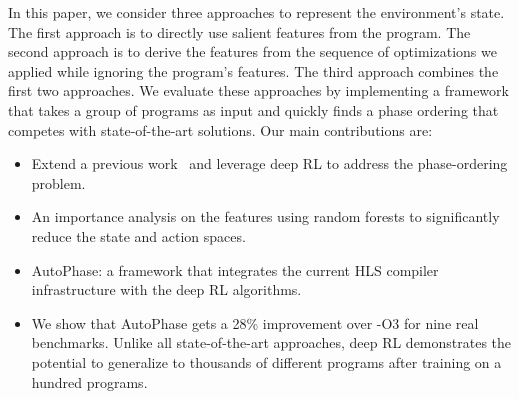 In this paper, we consider three approaches to represent the environment's state. The first approach is to directly use salient features from the program. The second approach is to derive the features from the sequence of optimizations we applied while ignoring the program's features. The third approach combines the first two approaches. We evaluate these approaches by implementing a framework that takes a group of programs as input and quickly finds a phase ordering that competes with state-of-the-art solutions.  %
Our main contributions are:
\begin{itemize}
\itemsep 0em 

    \item Extend a previous work~\cite{huang2019autophase} and leverage deep RL to address the phase-ordering problem.
    \item An importance analysis on the features using random forests to significantly reduce the state and action spaces.
    \item AutoPhase: a framework that integrates the current HLS compiler infrastructure with the deep RL algorithms.
    \item We show that AutoPhase gets a 28\% improvement over -O3 for nine real benchmarks.  Unlike all state-of-the-art approaches, deep RL demonstrates the potential to generalize to thousands of different programs after training on a hundred programs.
\end{itemize}